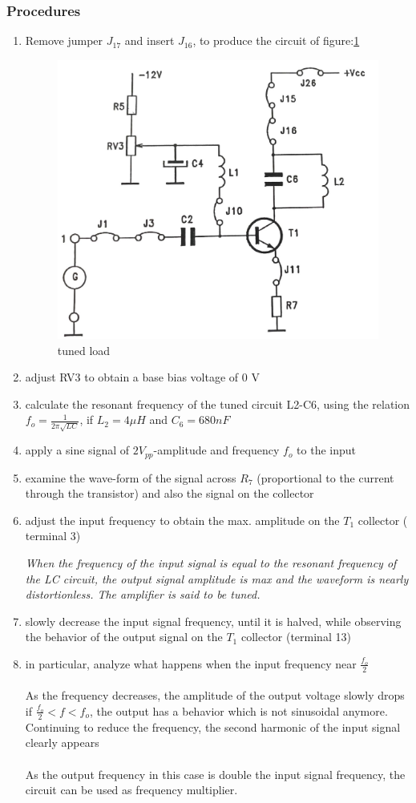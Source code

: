 \documentclass[12pt,a4paper]{report}
\begin{document}
\subsubsection{Procedures}
\begin{enumerate}
    \item Remove jumper $J_{17}$ and insert $J_{16}$, to produce the circuit of figure:\ref{fig:B32.3}
    \begin{figure}[H]
        \centering
        \includegraphics[width=0.5\linewidth]{analogue3_3.jpeg}
        \caption{tuned load}
        \label{fig:B32.3}
    \end{figure}
    \item adjust RV3 to obtain a base bias voltage of 0 V
    \item calculate the resonant frequency of the tuned circuit L2-C6, using the relation $f_o = \frac{1}{2\pi \sqrt{LC}}$, if $L_2 = 4\mu H$ and $C_6 = 680nF$
    \item apply a sine signal of $2V_{pp}$-amplitude and frequency $f_o$ to the input
    \item examine the wave-form of the signal across $R_7$ (proportional to the current through the transistor) and also the signal on the collector
    \item adjust the input frequency to obtain the max. amplitude on the $T_1$ collector ( terminal 3)
    
\textit{When the frequency of the input signal is equal to the resonant
frequency of the LC circuit, the output signal amplitude is max and the waveform is nearly distortionless. The amplifier is said to be tuned.}
    \item slowly decrease the input signal frequency, until it is halved, while observing the behavior of the output signal on the $T_1$ collector (terminal 13)
     \item in particular, analyze what happens when the input frequency near $\frac{f_o}{2}$
\\
\\
As the frequency decreases, the amplitude of the output voltage slowly drops if $\frac{f_o}{2}<f<f_o$, the output has a behavior which is not sinusoidal anymore. Continuing to reduce the frequency, the second harmonic of the input signal clearly appears
\\
\\
As the output frequency in this case is double the input signal
frequency, the circuit can be used as frequency multiplier.
\end{enumerate}
\end{document}
